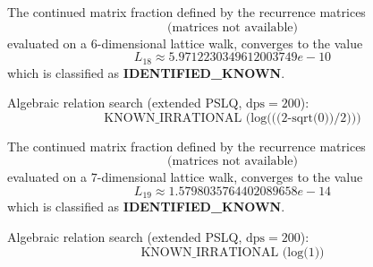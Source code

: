 \documentclass{amsart}
\begin{document}

\begin{theorem}
The continued matrix fraction defined by the recurrence matrices
\[
\text{(matrices not available)}
\]
evaluated on a \(6\)-dimensional lattice walk, converges to the value
\[
L_{ 18 } \approx 5.9712230349612003749e-10
\]
which is classified as \textbf{IDENTIFIED\_KNOWN}.

\noindent Algebraic relation search (extended PSLQ, $\mathrm{dps} = 200$):
\[
\text{KNOWN_IRRATIONAL (log(((2-sqrt(0))/2)))}
\]
\end{theorem}




\begin{theorem}
The continued matrix fraction defined by the recurrence matrices
\[
\text{(matrices not available)}
\]
evaluated on a \(7\)-dimensional lattice walk, converges to the value
\[
L_{ 19 } \approx 1.5798035764402089658e-14
\]
which is classified as \textbf{IDENTIFIED\_KNOWN}.

\noindent Algebraic relation search (extended PSLQ, $\mathrm{dps} = 200$):
\[
\text{KNOWN_IRRATIONAL (log(1))}
\]
\end{theorem}



\end{document}
